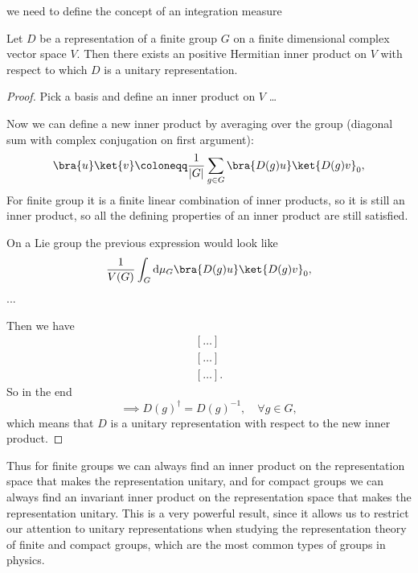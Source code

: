 we need to define the concept of an integration measure

\begin{proposition}
    Let \(D\) be a representation of a finite group \(G\) on a finite dimensional complex vector space \(V\). Then there exists an positive Hermitian inner product on \(V\) with respect to which \(D\) is a unitary representation.
\end{proposition}

\begin{proof}
    Pick a basis and define an inner product on \(V\) \dots

    Now we can define a new inner product by averaging over the group (diagonal sum with complex conjugation on first argument):
    \[
        \bra{u}\ket{v} \coloneqq \frac{1}{|G|} \sum_{g \in G} \bra{D(g)u}\ket{D(g)v}_0,
    \]
    For finite group it is a finite linear combination of inner products, so it is still an inner product, so all the defining properties of an inner product are still satisfied.

    On a Lie group the previous expression would look like
    \[
        \frac{1}{V(G)} \int_G \mathrm{d} \mu_G \bra{D(g)u}\ket{D(g)v}_0,
    \]
    ...

    Then we have
    \[
        \begin{aligned}
            [\dots ] \\
            [\dots ] \\
            [\dots ].
        \end{aligned}
    \]
    So in the end
    \[
        \implies D(g)^{\dagger} = D(g)^{-1}, \quad \forall g \in G,
    \]
    which means that \(D\) is a unitary representation with respect to the new inner product.
\end{proof}

Thus for finite groups we can always find an inner product on the representation space that makes the representation unitary, and for compact groups we can always find an invariant inner product on the representation space that makes the representation unitary. This is a very powerful result, since it allows us to restrict our attention to unitary representations when studying the representation theory of finite and compact groups, which are the most common types of groups in physics.





